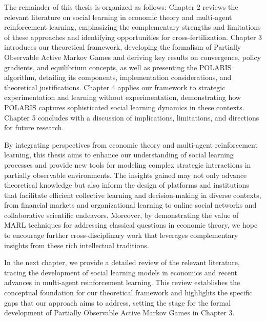 The remainder of this thesis is organized as follows: Chapter 2 reviews the relevant literature on social learning in economic theory and multi-agent reinforcement learning, emphasizing the complementary strengths and limitations of these approaches and identifying opportunities for cross-fertilization. Chapter 3 introduces our theoretical framework, developing the formalism of Partially Observable Active Markov Games and deriving key results on convergence, policy gradients, and equilibrium concepts, as well as presenting the POLARIS algorithm, detailing its components, implementation considerations, and theoretical justifications. Chapter 4 applies our framework to strategic experimentation and learning without experimentation, demonstrating how POLARIS captures sophisticated social learning dynamics in these contexts. Chapter 5 concludes with a discussion of implications, limitations, and directions for future research.

By integrating perspectives from economic theory and multi-agent reinforcement learning, this thesis aims to enhance our understanding of social learning processes and provide new tools for modeling complex strategic interactions in partially observable environments. The insights gained may not only advance theoretical knowledge but also inform the design of platforms and institutions that facilitate efficient collective learning and decision-making in diverse contexts, from financial markets and organizational learning to online social networks and collaborative scientific endeavors. Moreover, by demonstrating the value of MARL techniques for addressing classical questions in economic theory, we hope to encourage further cross-disciplinary work that leverages complementary insights from these rich intellectual traditions.

In the next chapter, we provide a detailed review of the relevant literature, tracing the development of social learning models in economics and recent advances in multi-agent reinforcement learning. This review establishes the conceptual foundation for our theoretical framework and highlights the specific gaps that our approach aims to address, setting the stage for the formal development of Partially Observable Active Markov Games in Chapter 3.